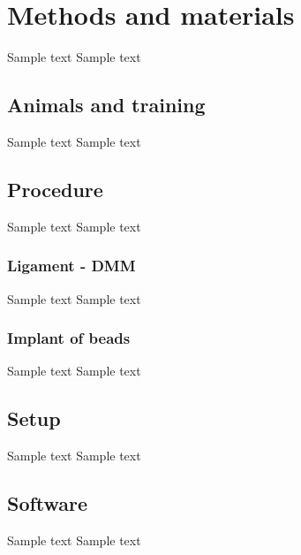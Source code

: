 \chapter{Methods and materials}

Sample text Sample text

\section{Animals and training}

Sample text Sample text

\section{Procedure}

Sample text Sample text

\subsection{Ligament - DMM}

Sample text Sample text

\subsection{Implant of beads}

Sample text Sample text

\section{Setup}


Sample text Sample text
\section{Software}

Sample text Sample text